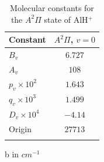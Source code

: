\documentclass[nofootinbib,aip,jcp,reprint]{revtex4-1}
\begin{document}
\begin{center}
\begin{table}
\begin{minipage}[b]{0.45\linewidth}
\let\TPToverlap=\TPTrlap
\caption{Molecular constants for the $A^2\Pi$ state of AlH$^{+}$ }
\renewcommand{\arraystretch}{1.25}
\begin{threeparttable}
\setlength{\tabcolsep}{1em}
\begin{tabular}{lc}
 \hline\colrule
Constant                                 &$A^2\Pi$,  $ v=0$   \\
 \hline\colrule
$B_{v}$                                   &$6.727$ \cite{almy1934band}     \\   \hline
$A_{v}$                                   &$108$ \cite{almy1934band}        \\ \hline
$p_{v}\times 10^{2}$             &$1.643$ \cite{szajna2011high}    \\ \hline
$q_{v}\times 10^{3}$             &$1.499$ \cite{szajna2011high}    \\ \hline
$D_{v}\times 10^{4}$             &$-4.14$ \cite{almy1934band}     \\ \hline
Origin                                      &$27713$ \cite{szajna2011high}   \\ 
\botrule
\end{tabular}
\begin{tablenotes}
\item[b] in $cm^{-1}$
\end{tablenotes}
\end{threeparttable}
\label{Aparameters}
\end{minipage}
\end{table}
\end{center}
\end{document}
